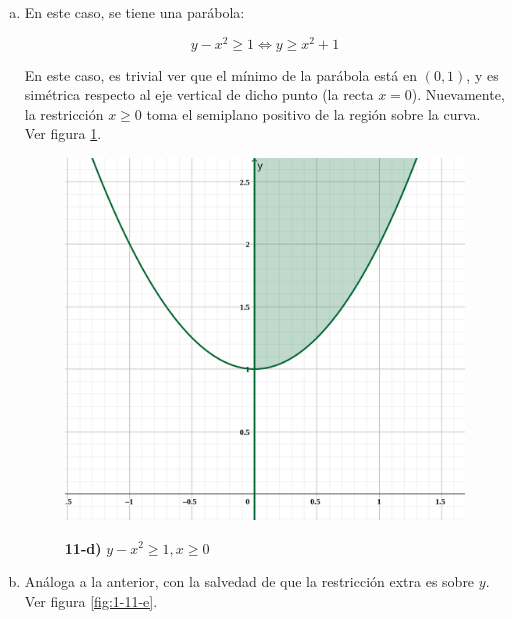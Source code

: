 \documentclass{article}
\begin{document}
\begin{enumerate}[(a)]
\item En este caso, se tiene una parábola:

\begin{equation}
y - x^2 \geq 1 \Leftrightarrow y \geq x^2 + 1
\end{equation}

En este caso, es trivial ver que el mínimo de la parábola está en $(0, 1)$, y es simétrica respecto al eje vertical de dicho punto (la recta $x = 0$). Nuevamente, la restricción $x \geq 0$ toma el semiplano positivo de la región sobre la curva. Ver figura \ref{fig:1-11-d}.

\begin{figure}[ht]
\caption{\textbf{11-d)} $y - x^2 \geq 1, x \geq 0$}
\includegraphics[scale=1.75]{img/ejercicios/1/11-d.png} 
\centering
\label{fig:1-11-d}
\end{figure}

\item Análoga a la anterior, con la salvedad de que la restricción extra es sobre $y$. Ver figura \ref{fig:1-11-e}.


\end{enumerate}
\end{document}
